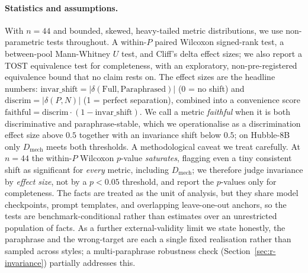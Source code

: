 \paragraph{Statistics and assumptions.}
With $n=44$ and bounded, skewed, heavy-tailed metric distributions, we use non-parametric tests
throughout. A within-$P$ paired Wilcoxon signed-rank test, a between-pool Mann-Whitney $U$ test, and
Cliff's delta effect sizes; we also report a TOST equivalence test for completeness, with an exploratory,
non-pre-registered equivalence bound that no claim rests on. The effect sizes are the headline numbers:
$\text{invar\_shift} = |\delta(\text{Full},\text{Paraphrased})|$ (0 = no shift) and $\text{discrim} =
|\delta(P,N)|$ (1 = perfect separation), combined into a convenience score $\text{faithful} = \text{discrim}
\cdot (1 - \text{invar\_shift})$. We call a metric \emph{faithful} when it is both discriminative and
paraphrase-stable, which we operationalise as a discrimination effect size above $0.5$ together with an
invariance shift below $0.5$; on Hubble-8B only $D_\text{mech}$ meets both thresholds. A methodological
caveat we treat carefully. At $n=44$ the within-$P$
Wilcoxon $p$-value \emph{saturates}, flagging even a tiny consistent shift as significant for \emph{every}
metric, including $D_\text{mech}$; we therefore judge invariance by \emph{effect size}, not by a
$p<0.05$ threshold, and report the $p$-values only for completeness. The facts are treated as the unit of
analysis, but they share model checkpoints, prompt templates, and overlapping leave-one-out anchors, so the
tests are benchmark-conditional rather than estimates over an unrestricted population of facts. As a further
external-validity limit we state honestly, the paraphrase and the wrong-target are each a single fixed
realisation rather than sampled across styles; a multi-paraphrase robustness check
(Section~\ref{sec:r-invariance}) partially addresses this.
